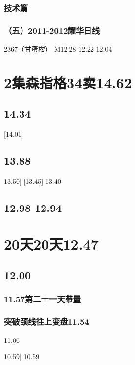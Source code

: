\documentclass{article}
\begin{document}
\clearpage

\subsubsection{技术篇}

\subsubsection{（五）2011-2012耀华日线}

2367（甘蛋楼） M12.28 12.22 12.04

\section{2集森指格34卖14.62}

\subsection{14.34}

[14.01]

\subsection{13.88}

13.50] [13.45] 13.40

\subsection{12.98 12.94}

\section{20天20天12.47}

\subsection{12.00}

\subsubsection{11.57第二十一天带量}

\subsubsection{突破颈线往上变盘11.54}

11.06

10.59] 10.59
\end{document}
